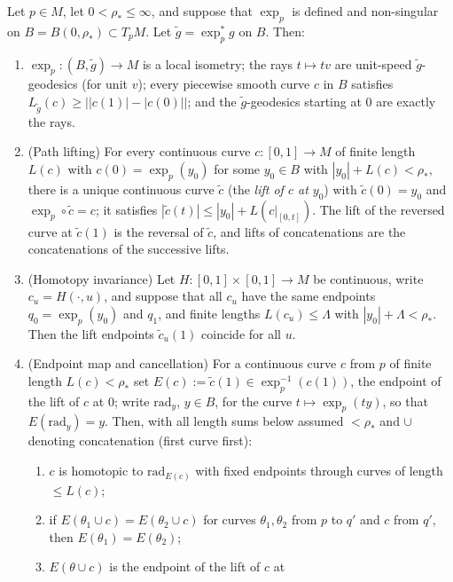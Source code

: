 \begin{lemma}
\label{lem:pullback-ball}
Let $p\in M$, let $0<\rho_*\le\infty$, and suppose that
$\exp_p$ is defined and non-singular on
$B=B(0,\rho_*)\subset T_pM$. Let $\tilde g=\exp_p^*g$ on $B$.
Then:
\begin{enumerate}
\item $\exp_p\colon (B,\tilde g)\to M$ is a local isometry; the
rays $t\mapsto tv$ are unit-speed $\tilde g$-geodesics (for unit
$v$); every piecewise smooth curve $c$ in $B$ satisfies
$L_{\tilde g}(c)\ge\bigl||c(1)|-|c(0)|\bigr|$; and the
$\tilde g$-geodesics starting at $0$ are exactly the rays.
\item (Path lifting) For every continuous curve $c\colon[0,1]\to M$
of finite length $L(c)$ with $c(0)=\exp_p(y_0)$ for some
$y_0\in B$ with $|y_0|+L(c)<\rho_*$, there is a unique continuous
curve $\tilde c$ (the \emph{lift of $c$ at $y_0$}) with $\tilde
c(0)=y_0$ and $\exp_p\circ\tilde c=c$; it satisfies $|\tilde
c(t)|\le|y_0|+L(c|_{[0,t]})$. The lift of the reversed curve at
$\tilde c(1)$ is the reversal of $\tilde c$, and lifts of
concatenations are the concatenations of the successive lifts.
\item (Homotopy invariance) Let $H\colon[0,1]\times[0,1]\to M$ be
continuous, write $c_u=H(\cdot,u)$, and suppose that all $c_u$ have
the same endpoints $q_0=\exp_p(y_0)$ and $q_1$, and finite
lengths $L(c_u)\le\Lambda$ with $|y_0|+\Lambda<\rho_*$. Then the
lift endpoints $\tilde c_u(1)$ coincide for all $u$.
\item (Endpoint map and cancellation) For a continuous curve $c$
from $p$ of finite length $L(c)<\rho_*$ set
$E(c):=\tilde c(1)\in\exp_p^{-1}(c(1))$, the endpoint of the
lift of $c$ at $0$; write $\mathrm{rad}_y$, $y\in B$, for the curve
$t\mapsto\exp_p(ty)$, so that $E(\mathrm{rad}_y)=y$. Then, with
all length sums below assumed $<\rho_*$ and $\cup$ denoting
concatenation (first curve first):
\begin{enumerate}
\item[(a)] $c$ is homotopic to $\mathrm{rad}_{E(c)}$ with fixed
endpoints through curves of length $\le L(c)$;
\item[(b)] if $E(\theta_1\cup c)=E(\theta_2\cup c)$ for curves
$\theta_1,\theta_2$ from $p$ to $q'$ and $c$ from $q'$, then
$E(\theta_1)=E(\theta_2)$;
\item[(c)] $E(\theta\cup c)$ is the endpoint of the lift of $c$ at

\end{enumerate}
\end{enumerate}
\end{lemma}
